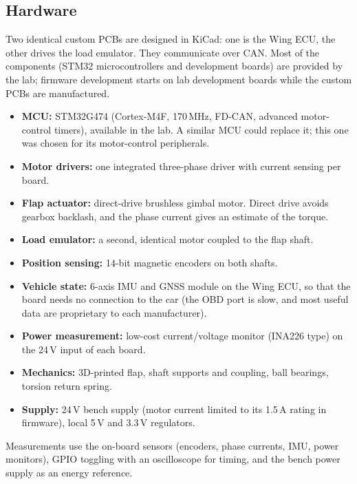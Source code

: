 \documentclass[11pt,a4paper]{article}
\begin{document}
\subsection{Hardware}
Two identical custom PCBs are designed in KiCad: one is the Wing ECU, the other drives the load emulator. They communicate over CAN. Most of the components (STM32 microcontrollers and development boards) are provided by the lab; firmware development starts on lab development boards while the custom PCBs are manufactured.
\begin{itemize}
  \item \textbf{MCU:} STM32G474 (Cortex-M4F, 170\,MHz, FD-CAN, advanced motor-control timers), available in the lab. A similar MCU could replace it; this one was chosen for its motor-control peripherals.
  \item \textbf{Motor drivers:} one integrated three-phase driver with current sensing per board.
  \item \textbf{Flap actuator:} direct-drive brushless gimbal motor. Direct drive avoids gearbox backlash, and the phase current gives an estimate of the torque.
  \item \textbf{Load emulator:} a second, identical motor coupled to the flap shaft.
  \item \textbf{Position sensing:} 14-bit magnetic encoders on both shafts.
  \item \textbf{Vehicle state:} 6-axis IMU and GNSS module on the Wing ECU, so that the board needs no connection to the car (the OBD port is slow, and most useful data are proprietary to each manufacturer).
  \item \textbf{Power measurement:} low-cost current/voltage monitor (INA226 type) on the 24\,V input of each board.
  \item \textbf{Mechanics:} 3D-printed flap, shaft supports and coupling, ball bearings, torsion return spring.
  \item \textbf{Supply:} 24\,V bench supply (motor current limited to its 1.5\,A rating in firmware), local 5\,V and 3.3\,V regulators.
\end{itemize}
Measurements use the on-board sensors (encoders, phase currents, IMU, power monitors), GPIO toggling with an oscilloscope for timing, and the bench power supply as an energy reference.
\end{document}
